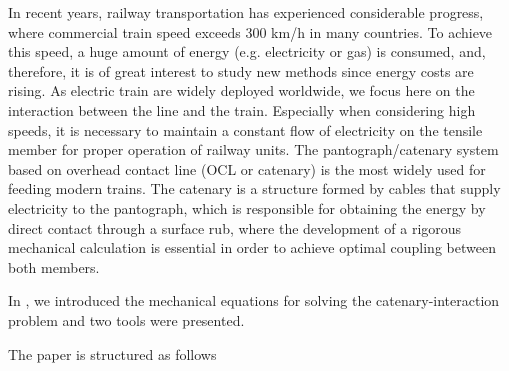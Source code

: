 In recent years, railway transportation has experienced considerable progress,
where commercial train speed exceeds 300 km/h in many countries.
To achieve this speed, a huge amount of energy (e.g. electricity or gas) is consumed, and,
therefore, it is of great interest to study new methods since energy costs are rising. As
electric train are widely deployed worldwide, we focus here on the interaction between the line and
the train. Especially when considering high speeds, it is
necessary to maintain a constant flow of electricity on the
tensile member for proper operation of railway units. The
pantograph/catenary system based on overhead contact line
(OCL or catenary) is the most widely used for feeding modern trains. 
The catenary is a structure formed by cables that
supply electricity to the pantograph, which is responsible for
obtaining the energy by direct contact through a surface rub,
where the development of a rigorous mechanical calculation
is essential in order to achieve optimal coupling between both
members.

In \cite{}, we introduced the mechanical equations for solving the catenary-interaction problem and two
tools were presented.



The paper is structured as follows 